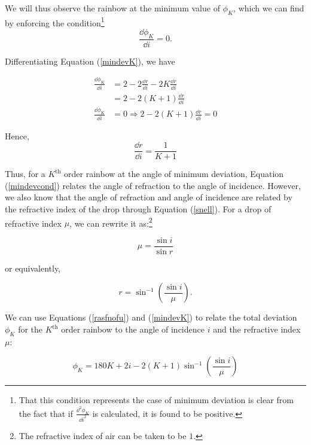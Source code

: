 We will thus observe the rainbow at the minimum value of $\phi_K$, which we can find by enforcing the condition\footnote{That this condition represents the case of minimum deviation is clear from the fact that if $\frac{\dd^2 \phi_K}{\dd i^2}$ is calculated, it is found to be positive.}  $$\frac{\dd\phi_K}{\dd i}=0.$$


Differentiating Equation (\ref{mindevK}), we have

\begin{equation*}
\begin{aligned}
\frac{\dd\phi_{K}}{\dd i}&=2-2\frac{\dd r}{\dd i}-2K\frac{\dd r}{\dd i}\\
&=2-2(K+1)\frac{\dd r}{\dd i}\\
\frac{\dd \phi_{K}}{\dd i}&=0\Rightarrow2-2(K+1)\frac{\dd r}{\dd i}=0
\end{aligned}
\end{equation*}

Hence,         
\begin{equation}
    \frac{\dd r}{\dd i}=\frac{1}{K+1}
    \label{mindevcond}
\end{equation}

Thus, for a $K^\text{th}$ order rainbow at the angle of minimum deviation, Equation (\ref{mindevcond}) relates the angle of refraction to the angle of incidence. However, we also know that the angle of refraction and angle of incidence are related by the refractive index of the drop through Equation (\ref{snell}). For a drop of refractive index $\mu$, we can rewrite it as:\footnote{The refractive index of air can be taken to be $1$.}

\begin{equation}
    \mu = \frac{\sin{i}}{\sin{r}}
    \label{snellir}
\end{equation}

 or equivalently,
 
 \begin{equation}
     r = \sin^{-1}\left(\frac{\sin{i}}{\mu}\right).
     \label{rasfnofu}
 \end{equation}

We can use  Equations (\ref{rasfnofu}) and (\ref{mindevK}) to relate the total deviation $\phi_K$ for the $K^\text{th}$ order rainbow to the angle of incidence $i$ and the refractive index $\mu$:
 
 \begin{equation}
     \phi_K = 180K + 2i - 2(K+1)\sin^{-1}\left(\frac{\sin i}{\mu}\right)
 \end{equation}


